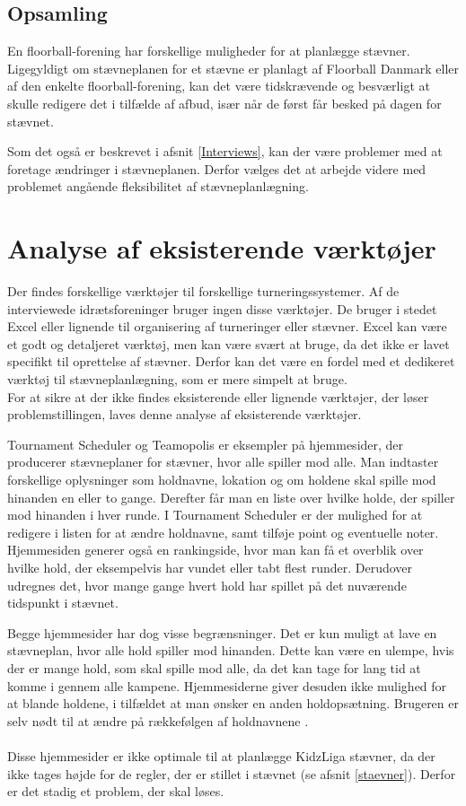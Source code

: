 \subsection*{Opsamling} 
En floorball-forening har forskellige muligheder for at planlægge stævner. Ligegyldigt om stævneplanen for et stævne er planlagt af Floorball Danmark eller af den enkelte floorball-forening, kan det være tidskrævende og besværligt at skulle redigere det i tilfælde af afbud, især når de først får besked på dagen for stævnet.
\par
Som det også er beskrevet i afsnit \ref{Interviews}, kan der være problemer med at foretage ændringer i stævneplanen. Derfor vælges det at arbejde videre med problemet angående fleksibilitet af stævneplanlægning.

\section{Analyse af eksisterende værktøjer}\label{eksisterendeProgrammer}
Der findes forskellige værktøjer til forskellige turneringssystemer. Af de interviewede idrætsforeninger bruger ingen disse værktøjer. De bruger i stedet Excel eller lignende til organisering af turneringer eller stævner. Excel kan være et godt og detaljeret værktøj, men kan være svært at bruge, da det ikke er lavet specifikt til oprettelse af stævner. Derfor kan det være en fordel med et dedikeret værktøj til stævneplanlægning, som er mere simpelt at bruge.\\
For at sikre at der ikke findes eksisterende eller lignende værktøjer, der løser problemstillingen, laves denne analyse af eksisterende værktøjer.
\par
Tournament Scheduler og Teamopolis er eksempler på hjemmesider, der producerer stævneplaner for stævner, hvor alle spiller mod alle. Man indtaster forskellige oplysninger som holdnavne, lokation og om holdene skal spille mod hinanden en eller to gange. Derefter får man en liste over hvilke holde, der spiller mod hinanden i hver runde. I Tournament Scheduler er der mulighed for at redigere i listen for at ændre holdnavne, samt tilføje point og eventuelle noter. Hjemmesiden generer også en rankingside, hvor man kan få et overblik over hvilke hold, der eksempelvis har vundet eller tabt flest runder. Derudover udregnes det, hvor mange gange hvert hold har spillet på det nuværende tidspunkt i stævnet.
\par
Begge hjemmesider har dog visse begrænsninger. Det er kun muligt at lave en stævneplan, hvor alle hold spiller mod hinanden. Dette kan være en ulempe, hvis der er mange hold, som skal spille mod alle, da det kan tage for lang tid at komme i gennem alle kampene. Hjemmesiderne giver desuden ikke mulighed for at blande holdene, i tilfældet at man ønsker en anden holdopsætning. Brugeren er selv nødt til at ændre på rækkefølgen af holdnavnene \citep{Teamopolis}\citep{TournamentScheduler}.
\\\\
Disse hjemmesider er ikke optimale til at planlægge KidzLiga stævner, da der ikke tages højde for de regler, der er stillet i stævnet (se afsnit \ref{staevner}). Derfor er det stadig et problem, der skal løses. 

